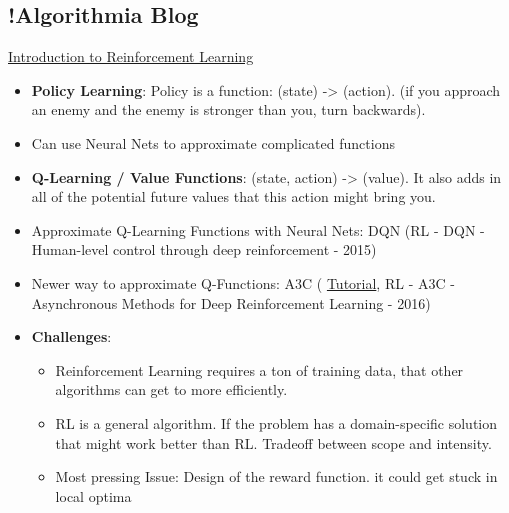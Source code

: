 \subsection{!Algorithmia Blog}
\href{https://algorithmia.com/blog/introduction-to-reinforcement-learning}{Introduction to Reinforcement Learning}
\begin{itemize}[noitemsep,nolistsep]
	\item \textbf{Policy Learning}: Policy is a function: (state) -> (action). (if you approach an enemy and the enemy is stronger than you, turn backwards).
	\item Can use Neural Nets to approximate complicated functions
	\item \textbf{Q-Learning / Value Functions}: (state, action) -> (value). It also adds in all of the potential future values that this action might bring you.
	\item Approximate Q-Learning Functions with Neural Nets: DQN (RL - DQN - Human-level control through deep reinforcement - 2015)
	\item Newer way to approximate Q-Functions: A3C ( \href{https://medium.com/emergent-future/simple-reinforcement-learning-with-tensorflow-part-8-asynchronous-actor-critic-agents-a3c-c88f72a5e9f2}{Tutorial}, RL - A3C - Asynchronous Methods for Deep Reinforcement Learning - 2016)
	\item \textbf{Challenges}:
	\begin{itemize}[noitemsep,nolistsep]
		\item Reinforcement Learning requires a ton of training data, that other algorithms can get to more efficiently.
		\item RL is a general algorithm. If the problem has a domain-specific solution that might work better than RL. Tradeoff between scope and intensity.
		\item Most pressing Issue: Design of the reward function. it could get stuck in local optima
	\end{itemize} 
\end{itemize}

